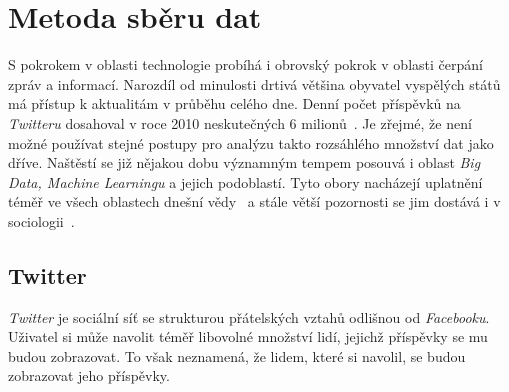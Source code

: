 \documentclass[12pt, a4paper]{article}
\numberwithin{equation}{section} 	%
\begin{document}
\newpage
\section{Metoda sběru dat}
\noindent S pokrokem v oblasti technologie probíhá i obrovský pokrok v oblasti čerpání zpráv a informací. Narozdíl od minulosti drtivá většina obyvatel vyspělých států má přístup k aktualitám v průběhu celého dne. Denní počet příspěvků na \textit{Twitteru} dosahoval v roce 2010 neskutečných 6 milionů~\cite{Mathioudakis2010}. Je zřejmé, že není možné používat stejné postupy pro analýzu takto rozsáhlého množství dat jako dříve. Naštěstí se již nějakou dobu významným tempem posouvá i oblast \textit{Big Data, Machine Learningu} a jejich podoblastí. Tyto obory nacházejí uplatnění téměř ve všech oblastech dnešní vědy~\cite{Huberman2012-2-15} a stále větší pozornosti se jim dostává i v sociologii~\cite{Tinati2014, McFarland2016, Shah2015-04-09}.


\subsection{Twitter}
\noindent\textit{Twitter} je sociální síť se strukturou přátelských vztahů odlišnou od \textit{Facebooku}. Uživatel si může navolit téměř libovolné množství lidí, jejichž příspěvky se mu budou zobrazovat. To však neznamená, že lidem, které si navolil, se budou zobrazovat jeho příspěvky.
\end{document}
